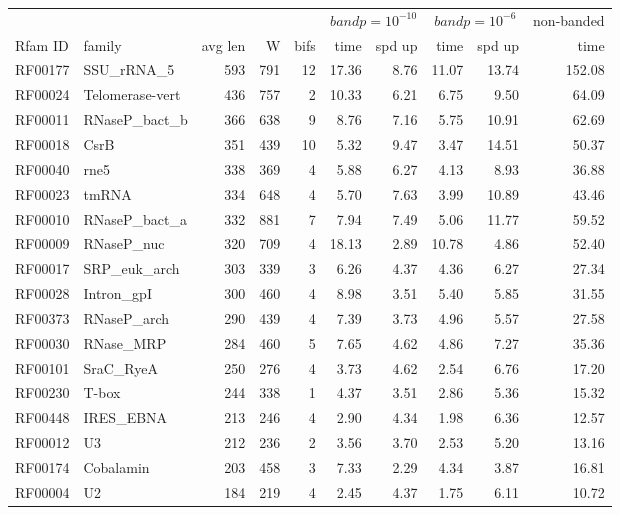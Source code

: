 \documentclass[11pt]{article}
\begin{document}
\begin{table}
\scriptsize
\begin{center}
\begin{tabular}{|ll|rrr|rr|rr|r|} \cline{6-10}
\multicolumn{5}{c}{} & \multicolumn{2}{|c|}{$bandp = 10^{-10}$} &
  \multicolumn{2}{c|}{$bandp = 10^{-6}$} & \multicolumn{1}{c|}{non-banded} \\ \cline{1-5}
Rfam ID & family & avg len & W & bifs & time & spd up & time & spd up & time \\ \hline 
RF00177 & SSU\_rRNA\_5 & 593 & 791 & 12 & 17.36 & 8.76 & 11.07 & 13.74 & 152.08 \\  
RF00024 & Telomerase-vert & 436 & 757 & 2 & 10.33 & 6.21 & 6.75 & 9.50 & 64.09 \\  
RF00011 & RNaseP\_bact\_b & 366 & 638 & 9 & 8.76 & 7.16 & 5.75 & 10.91 & 62.69 \\  
RF00018 & CsrB & 351 & 439 & 10 & 5.32 & 9.47 & 3.47 & 14.51 & 50.37 \\  
RF00040 & rne5 & 338 & 369 & 4 & 5.88 & 6.27 & 4.13 & 8.93 & 36.88 \\  
RF00023 & tmRNA & 334 & 648 & 4 & 5.70 & 7.63 & 3.99 & 10.89 & 43.46 \\  
RF00010 & RNaseP\_bact\_a & 332 & 881 & 7 & 7.94 & 7.49 & 5.06 & 11.77 & 59.52 \\  
RF00009 & RNaseP\_nuc & 320 & 709 & 4 & 18.13 & 2.89 & 10.78 & 4.86 & 52.40 \\  
RF00017 & SRP\_euk\_arch & 303 & 339 & 3 & 6.26 & 4.37 & 4.36 & 6.27 & 27.34 \\  
RF00028 & Intron\_gpI & 300 & 460 & 4 & 8.98 & 3.51 & 5.40 & 5.85 & 31.55 \\  
RF00373 & RNaseP\_arch & 290 & 439 & 4 & 7.39 & 3.73 & 4.96 & 5.57 & 27.58 \\  
RF00030 & RNase\_MRP & 284 & 460 & 5 & 7.65 & 4.62 & 4.86 & 7.27 & 35.36 \\  
RF00101 & SraC\_RyeA & 250 & 276 & 4 & 3.73 & 4.62 & 2.54 & 6.76 & 17.20 \\  
RF00230 & T-box & 244 & 338 & 1 & 4.37 & 3.51 & 2.86 & 5.36 & 15.32 \\  
RF00448 & IRES\_EBNA & 213 & 246 & 4 & 2.90 & 4.34 & 1.98 & 6.36 & 12.57 \\  
RF00012 & U3 & 212 & 236 & 2 & 3.56 & 3.70 & 2.53 & 5.20 & 13.16 \\  
RF00174 & Cobalamin & 203 & 458 & 3 & 7.33 & 2.29 & 4.34 & 3.87 & 16.81 \\  
RF00004 & U2 & 184 & 219 & 4 & 2.45 & 4.37 & 1.75 & 6.11 & 10.72 \\  

\end{tabular}
\end{center}
\end{table}
\end{document}
